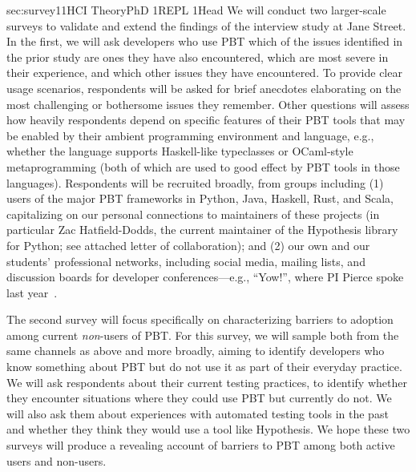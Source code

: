 %
   {sec:survey}{1}{1}{HCI Theory}{PhD 1}{REPL 1}{Head}
%
   We will conduct two larger-scale surveys to validate and extend the
   findings of the interview study at Jane Street.
%
In the first, we will
ask developers who use PBT which of the issues identified in the prior study are
ones they have also encountered, which are most severe
in their experience, and which
other issues they have encountered.
To provide
clear usage scenarios, respondents will
be asked for brief anecdotes elaborating on the
most challenging or bothersome issues they remember.  Other questions
will assess how
heavily respondents depend on specific features of their PBT tools
that may be enabled by their
ambient programming environment and language, e.g., whether the
language supports Haskell-like typeclasses or OCaml-style
metaprogramming (both of which are used to good effect by
PBT tools in those languages).
Respondents will
be recruited broadly, from groups including
(1)
users of the major PBT frameworks in Python, Java, Haskell, Rust, and
Scala, capitalizing on our personal connections to maintainers of
these projects (in particular Zac Hatfield-Dodds, the current
maintainer of the Hypothesis library for Python; see
attached letter of collaboration); and
(2) our own and our students' professional networks, including
social media, mailing lists, and discussion boards for developer
conferences---e.g., ``Yow!'', where PI Pierce spoke last
year~\cite{Pierce:Yow22}.

The second survey will focus specifically on characterizing barriers to adoption among current
{\em non}-users of PBT. For this survey, we will sample both from the
same channels as above and more broadly, aiming to identify developers
who know something about PBT but do
not use it as part of their everyday
practice. We will ask respondents about their current testing
practices, to identify whether they encounter situations where they could use
PBT but
currently do not. We will also ask them about experiences with automated
testing tools in the past and whether they think they would use a tool like
Hypothesis. We hope these two surveys will
produce a revealing account of barriers to PBT among both active users
and non-users.


%

